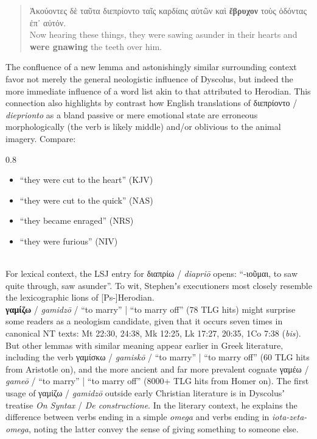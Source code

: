 \vspace*{3mm} 
 \begin{quote}Ἀκούοντες δὲ ταῦτα διεπρίοντο ταῖς καρδίαις αὐτῶν καὶ \textbf{ἔβρυχον} τοὺς ὀδόντας ἐπ᾽ αὐτόν. \\[1mm]
 Now hearing these things, they were sawing asunder in their hearts and \textbf{were gnawing} the teeth over him. \end{quote} %
\vspace*{3mm}

The confluence of a new lemma and astonishingly similar surrounding context %
favor not merely the general neologistic influence of Dyscolus, %
but indeed the more immediate influence of a word list akin to that attributed to Herodian. %
This connection also highlights by contrast how English %
translations of διεπρίοντο / \textit{dieprionto} as a bland passive %
or mere emotional state %
are erroneous morphologically (the verb is likely middle) %
and/or oblivious to the animal imagery. Compare: %

\begin{spacing}{0.8}
\begin{small}
\begin{itemize}
\item “they were cut to the heart” (KJV)
\item “they were cut to the quick” (NAS)
\item “they became enraged” (NRS)
\item “they were furious” (NIV)
\end{itemize}
\end{small}
\end{spacing} \\[1.5mm]

\noindent{}For lexical context, the LSJ entry for διαπρίω / \textit{diapriō} opens: %
“-ιοῦμαι, to saw quite through, saw asunder”. %
To wit, Stephenʼs executioners most closely resemble the lexicographic lions of [Ps-]Herodian. \\[2mm] %

\noindent{}\textbf{γαμίζω} / \textit{gamidzō} / “to marry” | “to marry off” (78 TLG hits) might surprise some readers as a neologism candidate, %
given that it occurs seven times in canonical NT texts: Mt 22:30, 24:38, Mk 12:25, Lk 17:27, 20:35, 1Co 7:38 (\textit{bis}). %
But other lemmas with similar meaning appear earlier in Greek literature, %
including the verb γαμίσκω / \textit{gamiskō} / “to marry” | “to marry off” (60 TLG hits from Aristotle on), %
and the more ancient and far more prevalent cognate γαμέω / \textit{gameō} / %
“to marry” | “to marry off” (8000+ TLG hits from Homer on). %
The first usage of γαμίζω / \textit{gamidzō} outside early %
Christian literature is in Dyscolusʼ treatise \textit{On Syntax} / \textit{De constructione}. %
In the literary context, %
he explains the difference between verbs ending in a simple \textit{omega} and verbs %
ending in \textit{iota-zeta-omega}, %
noting the latter convey the sense of giving something to someone else. %

